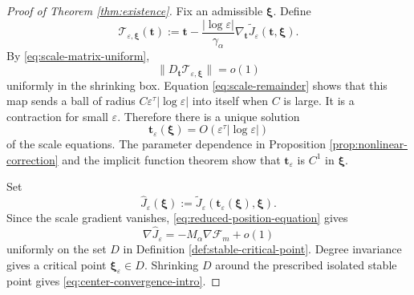 \documentclass[11pt]{article}
\numberwithin{equation}{section}
\begin{document}
\begin{proof}[Proof of Theorem \ref{thm:existence}]
Fix an admissible $\boldsymbol\xi$. Define
\begin{equation}\label{eq:scale-fixed-point-map}
\mathcal T_{\varepsilon,\boldsymbol\xi}(\boldsymbol t)
:=
\boldsymbol t
-\frac{|\log\varepsilon|}{\gamma_\alpha}
\nabla_{\boldsymbol t}\widetilde J_\varepsilon
(\boldsymbol t,\boldsymbol\xi).
\end{equation}
By \eqref{eq:scale-matrix-uniform},
\begin{equation*}
\|D_{\boldsymbol t}\mathcal T_{\varepsilon,\boldsymbol\xi}\|
=o(1)
\end{equation*}
uniformly in the shrinking box. Equation
\eqref{eq:scale-remainder} shows that this map sends a ball of radius
$C\varepsilon^\tau|\log\varepsilon|$ into itself when $C$ is large.
It is a contraction for small $\varepsilon$. Therefore there is a
unique solution
\begin{equation}\label{eq:t-solution}
\boldsymbol t_\varepsilon(\boldsymbol\xi)
=O(\varepsilon^\tau|\log\varepsilon|)
\end{equation}
of the scale equations. The parameter dependence in Proposition
\ref{prop:nonlinear-correction} and the implicit function theorem show
that $\boldsymbol t_\varepsilon$ is $C^1$ in $\boldsymbol\xi$.

Set
\begin{equation*}
\widehat J_\varepsilon(\boldsymbol\xi)
:=
\widetilde J_\varepsilon
(\boldsymbol t_\varepsilon(\boldsymbol\xi),\boldsymbol\xi).
\end{equation*}
Since the scale gradient vanishes,
\eqref{eq:reduced-position-equation} gives
\begin{equation}\label{eq:position-reduced-gradient}
\nabla\widehat J_\varepsilon
=-M_\alpha\nabla\mathcal F_m+o(1)
\end{equation}
uniformly on the set $D$ in Definition
\ref{def:stable-critical-point}. Degree invariance gives a critical
point $\boldsymbol\xi_\varepsilon\in D$. Shrinking $D$ around the
prescribed isolated stable point gives
\eqref{eq:center-convergence-intro}.


\end{proof}
\end{document}
